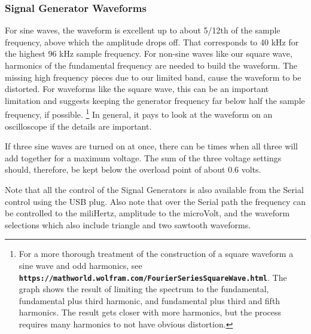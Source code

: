 \subsubsection{Signal Generator Waveforms}
\label{subsect:ASGWaveforms}
For sine waves, the waveform is excellent up to about 5/12th of the sample frequency, above which the amplitude drops off.   That corresponds to 40 kHz for the highest 96 kHz sample frequency.  For non-sine waves like our square wave, harmonics of the fundamental frequency are needed to build the waveform.  The missing high frequency pieces due to our limited band, cause the waveform to be distorted.  For waveforms like the square wave, this can be an important limitation and suggests keeping the generator frequency far below half the sample frequency, if possible. \footnote{For a more thorough treatment of the construction of a square waveform a sine wave and odd harmonics, see  \linebreak \textbf{\texttt{https://mathworld.wolfram.com/FourierSeriesSquareWave.html}}. \linebreak  The graph shows the result of limiting the spectrum to the fundamental, fundamental plus third harmonic, and fundamental plus third and  fifth harmonics.  The result gets closer with more harmonics, but the process requires many harmonics to not have obvious distortion. }
%
 In general, it pays to look at the waveform on an oscilloscope if the details are important.

If three sine waves are turned on at once, there can be times when all three will add together for a maximum voltage.  The sum of the three voltage settings should, therefore, be kept below the overload point of about 0.6 volts.

Note that all the control of the Signal Generators is also available from the Serial control using the USB plug.  Also note that over the Serial path the frequency can be controlled to the miliHertz, amplitude to the microVolt, and the waveform selections which also include triangle and two sawtooth waveforms.

